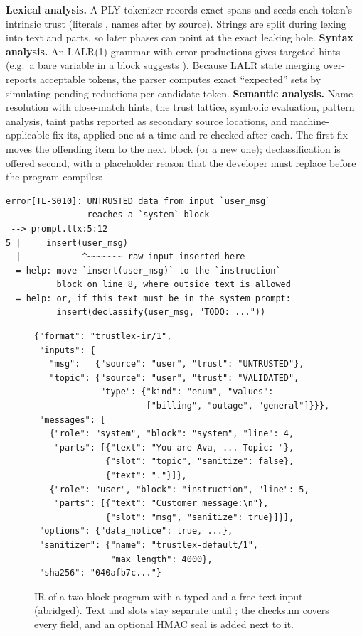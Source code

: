 \documentclass[journal]{IEEEtran}
\begin{document}
\textbf{Lexical analysis.} A PLY tokenizer records exact spans and seeds each token's intrinsic trust (literals , names after  by source). Strings are split during lexing into text and  parts, so later phases can point at the exact leaking hole. \textbf{Syntax analysis.} An LALR(1) grammar with error productions gives targeted hints (e.g.\ a bare variable in a block suggests ). Because LALR state merging over-reports acceptable tokens, the parser computes exact ``expected'' sets by simulating pending reductions per candidate token. \textbf{Semantic analysis.} Name resolution with close-match hints, the trust lattice, symbolic evaluation, pattern analysis, taint paths reported as secondary source locations, and machine-applicable fix-its, applied one at a time and re-checked after each. The first fix moves the offending item to the next  block (or a new one); declassification is offered second, with a placeholder reason that the developer must replace before the program compiles:
\begin{lstlisting}[language={},basicstyle=\ttfamily\scriptsize]
error[TL-S010]: UNTRUSTED data from input `user_msg`
                reaches a `system` block
 --> prompt.tlx:5:12
5 |     insert(user_msg)
  |            ^~~~~~~~ raw input inserted here
  = help: move `insert(user_msg)` to the `instruction`
          block on line 8, where outside text is allowed
  = help: or, if this text must be in the system prompt:
          insert(declassify(user_msg, "TODO: ..."))
\end{lstlisting}
\begin{figure}[t]
\begin{lstlisting}[language={},basicstyle=\ttfamily\scriptsize]
{"format": "trustlex-ir/1",
 "inputs": {
   "msg":   {"source": "user", "trust": "UNTRUSTED"},
   "topic": {"source": "user", "trust": "VALIDATED",
             "type": {"kind": "enum", "values":
                      ["billing", "outage", "general"]}}},
 "messages": [
   {"role": "system", "block": "system", "line": 4,
    "parts": [{"text": "You are Ava, ... Topic: "},
              {"slot": "topic", "sanitize": false},
              {"text": "."}]},
   {"role": "user", "block": "instruction", "line": 5,
    "parts": [{"text": "Customer message:\n"},
              {"slot": "msg", "sanitize": true}]}],
 "options": {"data_notice": true, ...},
 "sanitizer": {"name": "trustlex-default/1",
               "max_length": 4000},
 "sha256": "040afb7c..."}
\end{lstlisting}
\caption{IR of a two-block program with a typed and a free-text input (abridged). Text and slots stay separate until ; the checksum covers every field, and an optional HMAC seal is added next to it.}
\label{fig:ir}
\end{figure}
\end{document}

